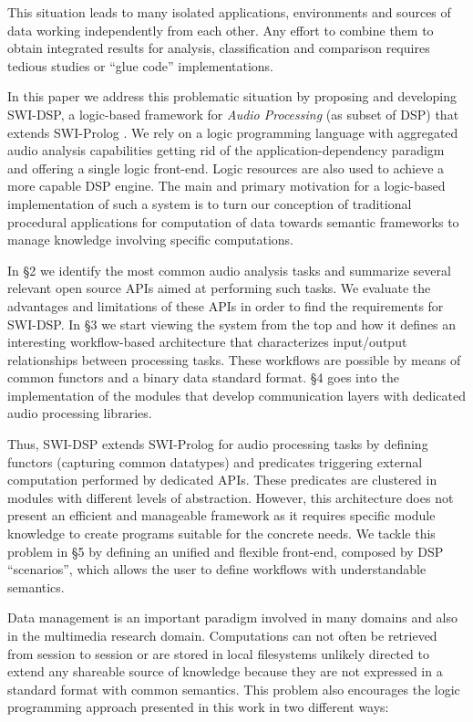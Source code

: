 \documentclass[runningheads]{llncs}
\begin{document}
This situation leads to many isolated applications, environments and sources of data working independently from each other. Any effort to combine them to obtain integrated results for analysis, classification and comparison requires tedious studies or ``glue code'' implementations.

In this paper we address this problematic situation by proposing and developing SWI-DSP, a logic-based framework for \textit{Audio Processing} (as subset of DSP) that extends SWI-Prolog \cite{swi}. We rely on a logic programming language with aggregated audio analysis capabilities getting rid of the application-dependency paradigm and offering a single logic front-end. Logic resources are also used to achieve a more capable DSP engine. The main and primary motivation for a logic-based implementation of such a system is to turn our conception of traditional procedural applications for computation of data towards semantic frameworks to manage knowledge involving specific computations.

In \S 2 we identify the most common audio analysis tasks and summarize several relevant open source APIs aimed at performing such tasks. We evaluate the advantages and limitations of these APIs in order to find the requirements for SWI-DSP. In \S 3 we start viewing the system from the top and how it defines an interesting workflow-based architecture that characterizes input/output relationships between processing tasks. These workflows are possible by means of common functors and a binary data standard format. \S 4 goes into the implementation of the modules that develop communication layers with dedicated audio processing libraries. %

Thus, SWI-DSP extends SWI-Prolog for audio processing tasks by defining functors (capturing common datatypes) and predicates triggering external computation performed by dedicated APIs. These predicates are clustered in modules with different levels of abstraction. However, this architecture does not present an efficient and manageable framework as it requires specific module knowledge to create programs suitable for the concrete needs. We tackle this problem in \S 5 by defining an unified and flexible front-end, composed by DSP ``scenarios'', which allows the user to define workflows with understandable semantics.

Data management is an important paradigm involved in many domains and also in the multimedia research domain. Computations can not often be retrieved from session to session or are stored in local filesystems unlikely directed to extend any shareable source of knowledge because they are not expressed in a standard format with common semantics. This problem also encourages the logic programming approach presented in this work in two different ways:
\end{document}
